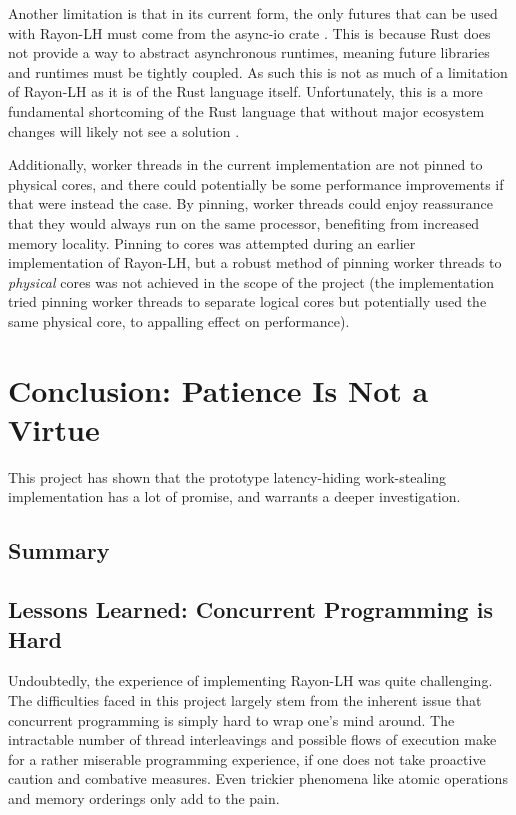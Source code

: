 \documentclass[bsc,frontabs,singlespacing,parskip,deptreport,normalheadings]{infthesis}
\begin{document}
Another limitation is that in its current form, the only futures that can be
used with Rayon-LH must come from the async-io crate
\cite{noauthor_async-io_2022}. This is because Rust does not provide a way to
abstract asynchronous runtimes, meaning future libraries and runtimes must be
tightly coupled. As such this is not as much of a limitation of Rayon-LH as it
is of the Rust language itself. Unfortunately, this is a more fundamental
shortcoming of the Rust language that without major ecosystem changes will
likely not see a solution \cite{-funswitch-loops_abstracting_2022}.

Additionally, worker threads in the current implementation are not pinned to
physical cores, and there could potentially be some performance improvements if
that were instead the case. By pinning, worker threads could enjoy reassurance
that they would always run on the same processor, benefiting from increased
memory locality. Pinning to cores was attempted during an earlier implementation
of Rayon-LH, but a robust method of pinning worker threads to \textit{physical}
cores was not achieved in the scope of the project (the implementation tried
pinning worker threads to separate logical cores but potentially used the same
physical core, to appalling effect on performance).


\chapter{Conclusion: Patience Is Not a Virtue}

This project has shown that the prototype latency-hiding work-stealing
implementation has a lot of promise, and warrants a deeper investigation.

\section{Summary}

\section{Lessons Learned: Concurrent Programming is Hard}

Undoubtedly, the experience of implementing Rayon-LH was quite challenging.
The difficulties faced in this project largely stem from the inherent issue that
concurrent programming is simply hard to wrap one's mind around. The intractable
number of thread interleavings and possible flows of execution make for a rather
miserable programming experience, if one does not take proactive caution and
combative measures. Even trickier phenomena like atomic operations and memory
orderings only add to the pain.
\end{document}
